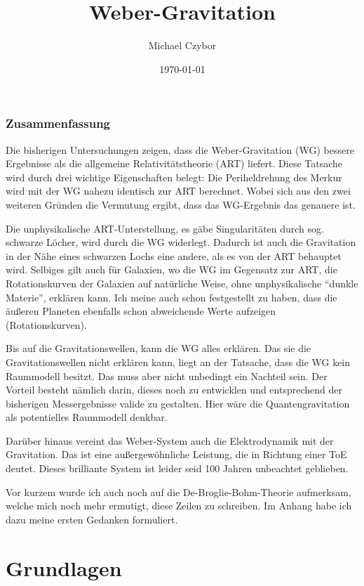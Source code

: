 \documentclass{book}
\numberwithin{equation}{section}
\begin{document}
\title{Weber-Gravitation}
\author{Michael Czybor}
\date{\today}
\maketitle

\section*{Zusammenfassung}
Die bisherigen Untersuchungen zeigen, dass die Weber-Gravitation (WG) bessere Ergebnisse als die allgemeine Relativitätstheorie (ART) liefert. Diese Tatsache wird durch drei wichtige
Eigenschaften belegt: Die Periheldrehung des Merkur wird mit der WG nahezu identisch zur ART berechnet. Wobei sich aus den zwei weiteren Gründen die Vermutung ergibt, dass das WG-Ergebnis
das genauere ist.

Die unphysikalische ART-Unterstellung, es gäbe Singularitäten durch sog. schwarze Löcher, wird durch die WG widerlegt. Dadurch ist auch die Gravitation in der Nähe eines schwarzen Lochs
eine andere, als es von der ART behauptet wird. Selbiges gilt auch für Galaxien, wo die WG im Gegensatz zur ART, die Rotationskurven der Galaxien auf natürliche Weise, ohne unphysikalische
\enquote{dunkle Materie}, erklären kann. Ich meine auch schon festgestellt zu haben, dass die äußeren Planeten ebenfalls schon abweichende Werte aufzeigen (Rotationskurven).

Bis auf die Gravitationswellen, kann die WG alles erklären. Das sie die Gravitationswellen nicht erklären kann, liegt an der Tatsache, dass die WG kein Raummodell besitzt. Das muss aber nicht
unbedingt ein Nachteil sein. Der Vorteil besteht nämlich darin, dieses noch zu entwicklen und entsprechend der bisherigen Messergebnisse valide zu gestalten. Hier wäre die Quantengravitation
als potentielles Raummodell denkbar.

Darüber hinaus vereint das Weber-System auch die Elektrodynamik mit der Gravitation. Das ist eine außergewöhnliche Leistung, die in Richtung einer ToE deutet. Dieses brilliante System ist
leider seid 100 Jahren unbeachtet geblieben.

Vor kurzem wurde ich auch noch auf die De-Broglie-Bohm-Theorie aufmerksam, welche mich noch mehr ermutigt, diese Zeilen zu schreiben. Im Anhang habe ich dazu meine ersten Gedanken formuliert.

\tableofcontents

\part{Grundlagen}
\end{document}
